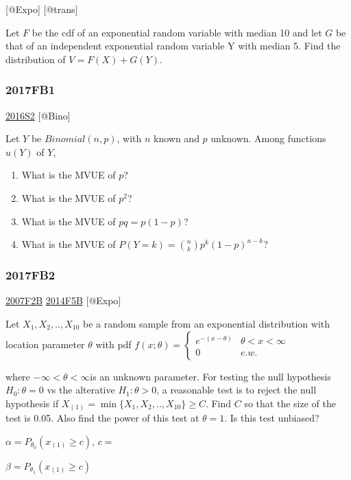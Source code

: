 \documentclass[6pt,Portrait]{article}
\begin{document}
{[}@Expo{]} {[}@trans{]}

Let \(F\) be the cdf of an exponential random variable with median 10
and let \(G\) be that of an independent exponential random variable Y
with median 5. Find the distribution of \(V=F(X)+G(Y)\).

\hypertarget{fb1-3}{%
\subsubsection{2017FB1}\label{fb1-3}}

\protect\hyperlink{s2-4}{2016S2} {[}@Bino{]}

Let \(Y\) be \(Binomial(n,p)\), with \(n\) known and \(p\) unknown.
Among functions \(u(Y)\) of \(Y\),

\begin{enumerate}
\def\labelenumi{(\alph{enumi})}
\item
  What is the MVUE of \(p\)?
\item
  What is the MVUE of \(p^2\)?
\item
  What is the MVUE of \(pq=p(1-p)\)?
\item
  What is the MVUE of \(P(Y=k)=\binom{n}{k}p^k(1-p)^{n-k}\)?
\end{enumerate}

\hypertarget{fb2-3}{%
\subsubsection{2017FB2}\label{fb2-3}}

\protect\hyperlink{f2b}{2007F2B} \protect\hyperlink{f5b-1}{2014F5B}
{[}@Expo{]}

Let \(X_1,X_2,..,X_{10}\) be a random sample from an exponential
distribution with location parameter \(\theta\) with pdf
\(f(x;\theta)=\begin{cases}e^{-(x-\theta)}& \theta<x<\infty\\0& e.w.\end{cases}\)

where \(-\infty<\theta<\infty\)is an unknown parameter. For testing the
null hypothesis \(H_0:\theta=0\) vs the alterative \(H_1:\theta>0\), a
reasonable test is to reject the null hypothesis if
\(X_{(1)}=\min\{X_1,X_2,..,X_{10}\}\ge C\). Find \(C\) so that the size
of the test is 0.05. Also find the power of this test at \(\theta=1\).
Is this test unbiased?

\(\alpha=P_{\theta_0}(x_{(1)}\ge c)\), \(c=\)

\(\beta=P_{\theta_1}(x_{(1)}\ge c)\)
\end{document}
